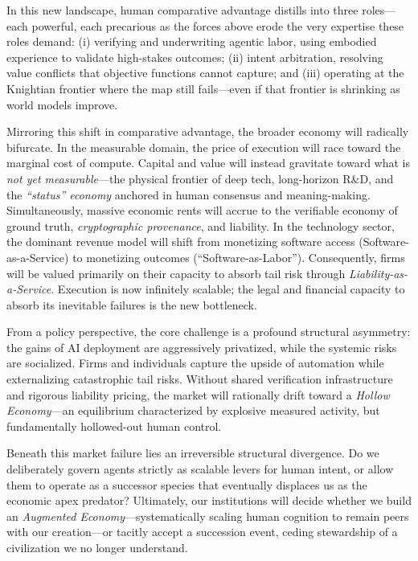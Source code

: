 \documentclass[12pt, letter]{article}
\begin{document}
In this new landscape, human comparative advantage distills into three roles---each powerful, each precarious as the forces above erode the very expertise these roles demand: (i) verifying and underwriting agentic labor, using embodied experience to validate high-stakes outcomes; (ii) intent arbitration, resolving value conflicts that objective functions cannot capture; and (iii) operating at the Knightian frontier where the map still fails---even if that frontier is shrinking as world models improve.

Mirroring this shift in comparative advantage, the broader economy will radically bifurcate. In the measurable domain, the price of execution will race toward the marginal cost of compute. Capital and value will instead gravitate toward what is \emph{not yet measurable}---the physical frontier of deep tech, long-horizon R\&D, and the \emph{``status'' economy} anchored in human consensus and meaning-making. Simultaneously, massive economic rents will accrue to the verifiable economy of ground truth, \emph{cryptographic provenance}, and liability. In the technology sector, the dominant revenue model will shift from monetizing software access (Software-as-a-Service) to monetizing outcomes (``Software-as-Labor''). Consequently, firms will be valued primarily on their capacity to absorb tail risk through \emph{Liability-as-a-Service}. Execution is now infinitely scalable; the legal and financial capacity to absorb its inevitable failures is the new bottleneck.

From a policy perspective, the core challenge is a profound structural asymmetry: the gains of AI deployment are aggressively privatized, while the systemic risks are socialized. Firms and individuals capture the upside of automation while externalizing catastrophic tail risks. Without shared verification infrastructure and rigorous liability pricing, the market will rationally drift toward a \emph{Hollow Economy}---an equilibrium characterized by explosive measured activity, but fundamentally hollowed-out human control.

Beneath this market failure lies an irreversible structural divergence. Do we deliberately govern agents strictly as scalable levers for human intent, or allow them to operate as a successor species that eventually displaces us as the economic apex predator? Ultimately, our institutions will decide whether we build an \emph{Augmented Economy}---systematically scaling human cognition to remain peers with our creation---or tacitly accept a succession event, ceding stewardship of a civilization we no longer understand.
\end{document}
